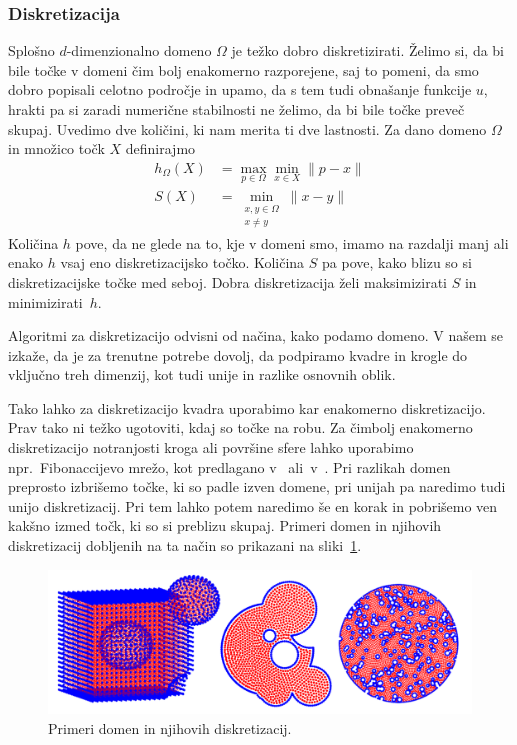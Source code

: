 \documentclass[12pt,a4paper]{article}
\theoremstyle{definition} %
\theoremstyle{plain} %
\begin{document}
\subsubsection{Diskretizacija}
Splošno $d$-dimenzionalno domeno $\Omega$ je težko dobro diskretizirati.
Želimo si, da bi bile točke v domeni čim bolj enakomerno razporejene, saj to
pomeni, da smo dobro popisali celotno področje in upamo, da s tem tudi obnašanje
funkcije $u$, hrakti pa si zaradi numerične stabilnosti ne želimo, da bi bile
točke preveč skupaj. Uvedimo dve količini, ki nam merita ti dve lastnosti.
Za dano domeno $\Omega$ in množico točk $X$ definirajmo
\begin{align}
  h_\Omega(X) &= \max_{p \in \Omega} \min_{x \in X} \|p - x\| \\
  \label{eq:def-hs}
  S(X) &= \min_{\substack{x, y \in \Omega \\ x \neq y}} \|x-y\| \nonumber
\end{align}
Količina $h$ pove, da ne glede na to, kje v domeni smo, imamo na razdalji manj ali enako $h$
vsaj eno diskretizacijsko točko. Količina $S$ pa pove, kako blizu so si
diskretizacijske točke med seboj. Dobra diskretizacija želi maksimizirati $S$ in
minimizirati~$h$.

Algoritmi za diskretizacijo odvisni od načina, kako podamo domeno.
V našem se izkaže, da je za trenutne potrebe dovolj, da podpiramo
kvadre in krogle do vključno treh dimenzij, kot tudi unije in razlike
osnovnih oblik.

Tako lahko za diskretizacijo kvadra uporabimo kar enakomerno diskretizacijo.
Prav tako ni težko ugotoviti, kdaj so točke na robu. Za čimbolj enakomerno
diskretizacijo notranjosti kroga ali površine sfere
lahko uporabimo npr.~Fibonaccijevo mrežo, kot predlagano
v~\cite{hannay2004fibonacci} ali~v~\cite{gonzalez2010measurement}.
Pri razlikah domen preprosto izbrišemo točke, ki so padle izven domene,
pri unijah pa naredimo tudi unijo diskretizacij. Pri tem lahko potem naredimo še
en korak in pobrišemo ven kakšno izmed točk, ki so si preblizu skupaj.
Primeri domen in njihovih diskretizacij dobljenih na ta način so prikazani na sliki~\ref{fig:domains}.
\begin{figure}[!ht]
  \centering
  \includegraphics[width=\textwidth]{images/domains_generated.png}
  \caption{Primeri domen in njihovih diskretizacij.}
  \label{fig:domains}
\end{figure}
\end{document}
